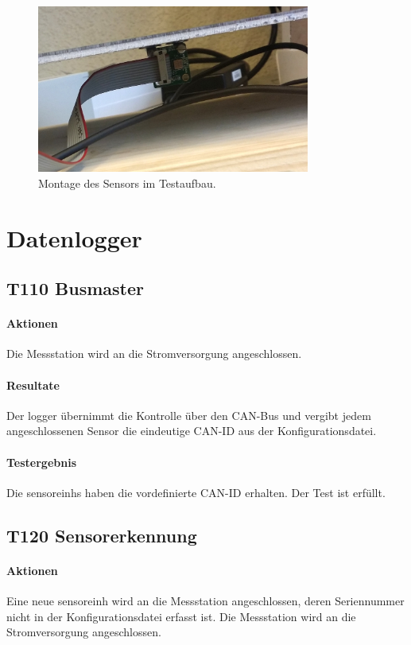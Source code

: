 \begin{figure}
	\centering
		\includegraphics[width=0.8\textwidth]{images/fotos/testaufbau2.jpg}
	\caption{Montage des Sensors im Testaufbau.}
	\label{fig.testaufbau2}
\end{figure}

\section{Datenlogger}
\subsection{T110 Busmaster}
\paragraph{Aktionen} Die Messstation wird an die Stromversorgung angeschlossen.

\paragraph{Resultate} Der \gls{logger} übernimmt die Kontrolle über den CAN-Bus und vergibt jedem angeschlossenen Sensor die eindeutige CAN-ID aus der Konfigurationsdatei.

\paragraph{Testergebnis} Die \glspl{sensoreinh} haben die vordefinierte CAN-ID erhalten. Der Test ist erfüllt.

\subsection{T120 Sensorerkennung}
\paragraph{Aktionen} Eine neue \gls{sensoreinh} wird an die Messstation angeschlossen, deren Seriennummer nicht in der Konfigurationsdatei erfasst ist. Die Messstation wird an die Stromversorgung angeschlossen.

